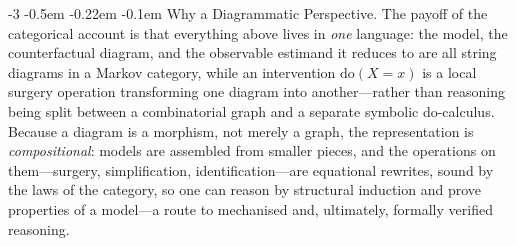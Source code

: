 \documentclass[runningheads]{llncs}
\makeatletter
\renewcommand\paragraph{\@startsection{paragraph}{4}{\z@}%
                       {-3\p@ \@plus -2\p@ \@minus -2\p@}%
                       {-0.5em \@plus -0.22em \@minus -0.1em}%
                       {\normalfont\normalsize\bfseries}}
\makeatother
\begin{document}
\paragraph{Why a Diagrammatic Perspective.}
The payoff of the categorical account is that everything above lives in \emph{one} language: the model, the counterfactual diagram, and the observable estimand it reduces to are all string diagrams in a Markov category, while an intervention $\mathrm{do}(X{=}x)$ is a local surgery operation transforming one diagram into another---rather than reasoning being split between a combinatorial graph and a separate symbolic do-calculus. Because a diagram is a morphism, not merely a graph, the representation is \emph{compositional}: models are assembled from smaller pieces, and the operations on them---surgery, simplification, identification---are equational rewrites, sound by the laws of the category, so one can reason by structural induction and prove properties of a model---a route to mechanised and, ultimately, formally verified reasoning.
\end{document}
